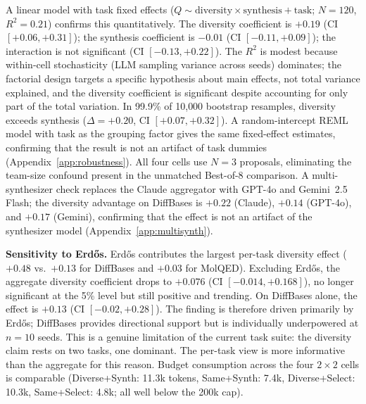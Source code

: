 \documentclass{article}
\begin{document}
A linear model with task fixed effects ($Q \sim \text{diversity} \times \text{synthesis} + \text{task}$; $N{=}120$, $R^{2}{=}0.21$) confirms this quantitatively. The diversity coefficient is $+0.19$ (CI $[+0.06, +0.31]$); the synthesis coefficient is $-0.01$ (CI $[-0.11, +0.09]$); the interaction is not significant (CI $[-0.13, +0.22]$). The $R^{2}$ is modest because within-cell stochasticity (LLM sampling variance across seeds) dominates; the factorial design targets a specific hypothesis about main effects, not total variance explained, and the diversity coefficient is significant despite accounting for only part of the total variation. In 99.9\% of 10{,}000 bootstrap resamples, diversity exceeds synthesis ($\Delta{=}+0.20$, CI $[+0.07, +0.32]$). A random-intercept REML model with task as the grouping factor gives the same fixed-effect estimates, confirming that the result is not an artifact of task dummies (Appendix~\ref{app:robustness}). All four cells use $N{=}3$ proposals, eliminating the team-size confound present in the unmatched Best-of-8 comparison. A multi-synthesizer check replaces the Claude aggregator with GPT-4o and Gemini~2.5 Flash; the diversity advantage on DiffBases is $+0.22$ (Claude), $+0.14$ (GPT-4o), and $+0.17$ (Gemini), confirming that the effect is not an artifact of the synthesizer model (Appendix~\ref{app:multisynth}).

\textbf{Sensitivity to Erd\H{o}s.} Erd\H{o}s contributes the largest per-task diversity effect ($+0.48$ vs.\ $+0.13$ for DiffBases and $+0.03$ for MolQED). Excluding Erd\H{o}s, the aggregate diversity coefficient drops to $+0.076$ (CI $[-0.014, +0.168]$), no longer significant at the 5\% level but still positive and trending. On DiffBases alone, the effect is $+0.13$ (CI $[-0.02, +0.28]$). The finding is therefore driven primarily by Erd\H{o}s; DiffBases provides directional support but is individually underpowered at $n{=}10$ seeds. This is a genuine limitation of the current task suite: the diversity claim rests on two tasks, one dominant. The per-task view is more informative than the aggregate for this reason. Budget consumption across the four $2{\times}2$ cells is comparable (Diverse+Synth: 11.3k tokens, Same+Synth: 7.4k, Diverse+Select: 10.3k, Same+Select: 4.8k; all well below the 200k cap).
\end{document}

